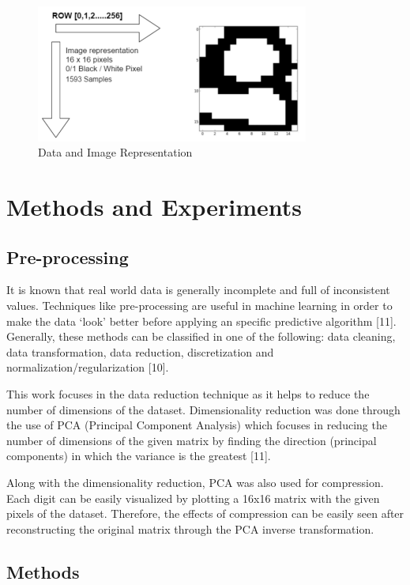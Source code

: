 \documentclass[letterpaper,10pt]{article}
\theoremstyle{mytheor}
\begin{document}
\begin{figure}[H]
\includegraphics[width=0.8\textwidth]{dataset}
\centering
\caption{Data and Image Representation}
\label{fig:1}
\end{figure}

\section{Methods and Experiments}

\subsection{Pre-processing}

It is known that real world data is generally incomplete and full of inconsistent values. Techniques like pre-processing are useful in machine learning in order to make the data ‘look’ better before applying an specific predictive algorithm [11]. Generally, these methods can be classified in one of the following: data cleaning, data transformation, data reduction, discretization and normalization/regularization [10].

This work focuses in the data reduction technique as it helps to reduce the number of dimensions of the dataset. Dimensionality reduction was done through the use of PCA (Principal Component Analysis) which focuses in reducing the number of dimensions of the given matrix by finding the direction (principal components) in which the variance is the greatest [11].

Along with the dimensionality reduction, PCA was also used for compression. Each digit can be easily visualized by plotting a 16x16 matrix with the given pixels of the dataset. Therefore, the effects of compression can be easily seen after reconstructing the original matrix through the PCA inverse transformation. 
 
\subsection{Methods}
\end{document}
